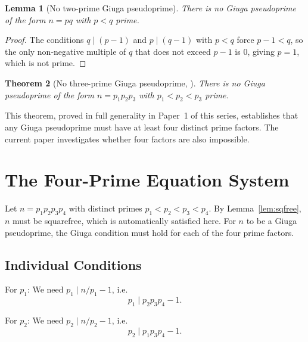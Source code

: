 \documentclass[12pt,a4paper]{amsart}
\newtheorem{theorem}{Theorem}[section]
\newtheorem{lemma}[theorem]{Lemma}
\theoremstyle{definition}
\begin{document}
\begin{lemma}[No two-prime Giuga pseudoprime]
\label{lem:twoprime}
There is no Giuga pseudoprime of the form $n = pq$ with $p < q$ prime.
\end{lemma}

\begin{proof}
The conditions $q \mid (p-1)$ and $p \mid (q-1)$ with $p < q$ force
$p - 1 < q$, so the only non-negative multiple of $q$ that does not exceed
$p - 1$ is $0$, giving $p = 1$, which is not prime.
\end{proof}

\begin{theorem}[No three-prime Giuga pseudoprime, {\cite{FuhrmannPaper1}}]
\label{thm:threeprime}
There is no Giuga pseudoprime of the form $n = p_1 p_2 p_3$ with
$p_1 < p_2 < p_3$ prime.
\end{theorem}

This theorem, proved in full generality in Paper~1 of this series, establishes
that any Giuga pseudoprime must have at least four distinct prime factors.
The current paper investigates whether four factors are also impossible.

\section{The Four-Prime Equation System}
\label{sec:system}

Let $n = p_1 p_2 p_3 p_4$ with distinct primes $p_1 < p_2 < p_3 < p_4$.
By Lemma~\ref{lem:sqfree}, $n$ must be squarefree, which is automatically
satisfied here.  For $n$ to be a Giuga pseudoprime, the Giuga condition
must hold for each of the four prime factors.

\subsection{Individual Conditions}

For $p_1$: We need $p_1 \mid n/p_1 - 1$, i.e.\
\begin{equation}
  p_1 \mid p_2 p_3 p_4 - 1.
  \tag{G1}
  \label{eq:G1}
\end{equation}

For $p_2$: We need $p_2 \mid n/p_2 - 1$, i.e.\
\begin{equation}
  p_2 \mid p_1 p_3 p_4 - 1.
  \tag{G2}
  \label{eq:G2}
\end{equation}
\end{document}
